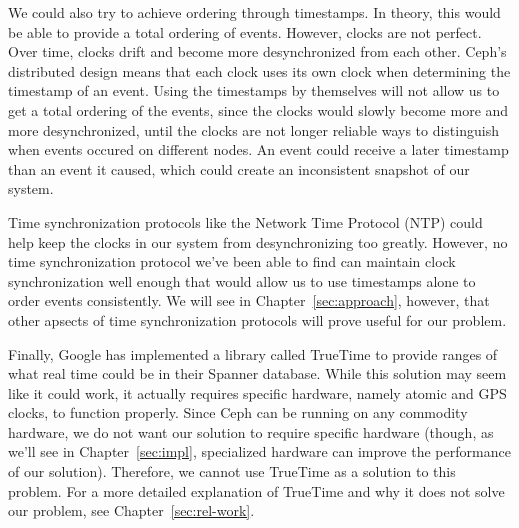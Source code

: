 We could also try to achieve ordering through timestamps. In theory,
this would be able to provide a total ordering of events. However, clocks are not perfect. Over time, clocks drift and become more desynchronized from each other. Ceph's distributed design means that each clock uses its own clock
when determining the timestamp of an event. Using the timestamps by themselves
will not allow us to get a total ordering of the events, since the clocks
would slowly become more and more desynchronized, until the clocks are not 
longer reliable ways to distinguish when events occured on different nodes. An 
event could receive a later timestamp than an event it caused, which could 
create an inconsistent snapshot of our system. 

Time synchronization protocols like the Network Time Protocol (NTP) could help
keep the clocks in our system from desynchronizing too greatly. However, no
time synchronization protocol we've been able to find can maintain 
clock synchronization well enough that would allow us to use timestamps alone
to order events consistently. We will see in Chapter~\ref{sec:approach}, 
however, that other apsects of time synchronization protocols will prove useful
for our problem.

Finally, Google has implemented a library called TrueTime to provide ranges of 
what real time could be in their Spanner database. While this solution may seem like
it could work, it actually requires specific hardware, namely atomic and GPS
clocks, to function properly. Since Ceph can be running on any commodity hardware, we do
not want our solution to require specific hardware (though, as we'll see in 
Chapter~\ref{sec:impl}, specialized hardware can improve the performance of
our solution). Therefore, we cannot use TrueTime as a solution to this 
problem. For a more detailed explanation of TrueTime and why it does not solve 
our problem, see Chapter~\ref{sec:rel-work}.














